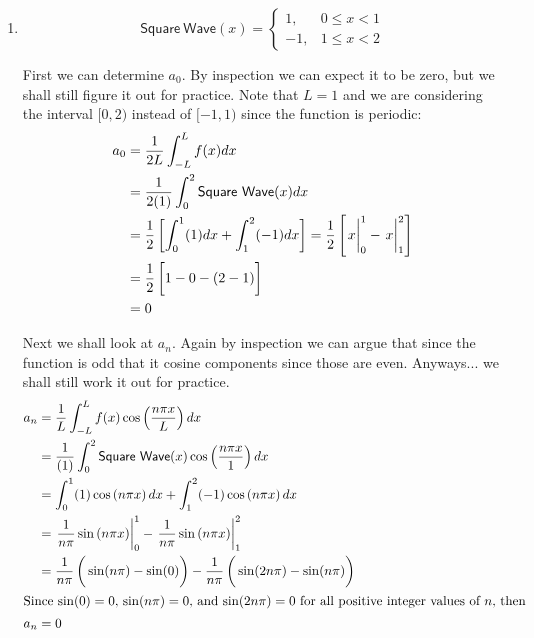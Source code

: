 \documentclass[11pt,letterpaper,twoside]{book}
\newenvironment{mathstuff}
   {\cbcolor{black}\par \vspace{8pt} \cbstart \vspace{-15pt} \begin{enumerate} \item[]}
   {\end{enumerate} \vspace{-5pt} \cbend \par \vspace{7pt} }
\begin{document}
\begin{mathstuff}
\[
\mathsf{Square\ Wave}(x) = \left\{ 
      \begin{array}{ll} 1, & 0 \leq x < 1 \\ 
                       -1, & 1 \leq x < 2 \end{array} \right.
\]

First we can determine $a_0$.  By inspection we can expect it to be zero, but we shall still 
figure it out for practice.  Note that $L = 1$ and we are considering the interval $[0, 2)$ instead
of $[-1, 1)$ since the function is periodic:
\begin{align*}
a_0 &= \frac{1}{2L} \int_{-L}^L f(x) dx  \\
    &= \frac{1}{2(1)} \int_{0}^{2} \mathsf{Square\ Wave}(x) dx \\
    &= \frac{1}{2} \left[ \int_0^1 (1) dx + \int_1^2 (-1) dx \right] = \frac{1}{2} \left[ \left. \vphantom{\frac{1}{2}} x\right|^1_0 - \left. \vphantom{\frac{1}{2}} x\right|^2_1 \right] \\
    &= \frac{1}{2} \left[ \vphantom{\frac{1}{2}} 1 - 0 - (2 - 1) \right] \\
    &= 0
\end{align*}

Next we shall look at $a_n$.  Again by inspection we can argue that since the function is odd that it
cosine components since those are even.  Anyways... we shall still work it out for practice.
\begin{align*}
a_n &= \frac{1}{L}  \int_{-L}^L f(x) \cos \left( \frac{n\pi x}{L} \right) dx \\
    &= \frac{1}{(1)} \int_{0}^{2} \mathsf{Square\ Wave}(x)\cos \left( \frac{n\pi x}{1} \right) dx \\ 
    &= \int_0^1 (1) \cos \left( n\pi x \right) dx + \int_1^2 (-1) \cos \left( n\pi x \right) dx \\
    &= \left. \frac{1}{n \pi} \sin \left( n\pi x \right)\right|^1_0 -  \left. \frac{1}{n \pi} \sin \left( n\pi x \right)\right|^2_1 \\
    &= \frac{1}{n \pi} \left( \vphantom{\frac{1}{2}} \sin ( n\pi) - \sin(0) \right) - \frac{1}{n \pi} \left( \vphantom{\frac{1}{2}} \sin (2n\pi) - \sin(n\pi) \right) \\
\intertext{Since $\sin(0) = 0$, $\sin ( n\pi) = 0$, and $\sin (2n\pi) = 0$ for all positive integer values of $n$, then}
a_n &= 0
\end{align*}


\end{mathstuff}
\end{document}
